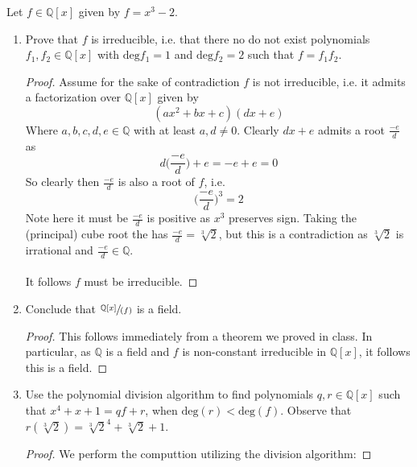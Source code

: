 \documentclass[12pt]{article}
\newenvironment{ex}[2][Exercise]{\begin{trivlist}
\item[\hskip \labelsep {\bfseries #1}\hskip \labelsep {\bfseries #2.}]}{\end{trivlist}}
\begin{document}
\begin{ex}{4}
    Let $f \in \mathbb{Q}[x]$ given by $f = x^3 - 2$.
    \begin{enumerate}[label=(\alph*)]
        \item Prove that $f$ is irreducible, i.e. that there no do not exist polynomials $f_1, f_2 \in \mathbb{Q}[x]$ with $\text{deg}f_1 = 1$ and $\text{deg}f_2 = 2$ such that $f = f_1f_2$.
        \begin{proof}
            Assume for the sake of contradiction $f$ is not irreducible, i.e. it admits a factorization over $\mathbb{Q}[x]$ given by 
            \begin{equation}
                (ax^2 + bx + c)(dx + e)
            \end{equation}
            Where $a, b, c, d, e \in \mathbb{Q}$ with at least $a, d \neq 0$. Clearly $dx + e$ admits a root $\frac{-e}{d}$ as 
            \begin{equation}
                d\Big (\frac{-e}{d} \Big ) + e = -e + e = 0
            \end{equation}
            So clearly then $\frac{-e}{d}$ is also a root of $f$, i.e. 
            \begin{equation}
                \Big ( \frac{-e}{d} \Big)^3 = 2
            \end{equation}
            Note here it must be $\frac{-e}{d}$ is positive as $x^3$ preserves sign. Taking the (principal) cube root the has $\frac{-e}{d} = \sqrt[3]{2}$, but this is a contradiction as $\sqrt[3]{2}$ is irrational and $\frac{-e}{d} \in \mathbb{Q}$. \\ \\
            It follows $f$ must be irreducible.
        \end{proof}
        \item Conclude that $\sfrac{\mathbb{Q}[x]}{(f)}$ is a field.
        \begin{proof}
            This follows immediately from a theorem we proved in class. In particular, as $\mathbb{Q}$ is a field and $f$ is non-constant irreducible in $\mathbb{Q}[x]$, it follows this is a field.
        \end{proof}
    \item Use the polynomial division algorithm to find polynomials $q, r \in \mathbb{Q}[x]$ such that $x^4 + x + 1 = qf + r$, when $\text{deg}(r) < \text{deg}(f)$. Observe that $r(\sqrt[3]{2}) = \sqrt[3]{2}^4 + \sqrt[3]{2} + 1$.
    \begin{proof}
        We perform the computtion utilizing the division algorithm:

\end{proof}
\end{enumerate}
\end{ex}
\end{document}
